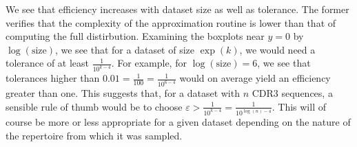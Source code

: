 \documentclass{article}
\begin{document}
We see that efficiency increases with dataset size as well as tolerance.
The former verifies that the complexity of the approximation routine is lower than that of computing the full distirbution.
Examining the boxplots near $y = 0$ by $\log(\text{size})$, we see that for a dataset of size $\exp(k)$, we would need a tolerance of at least $\frac{1}{10^{k - 4}}$.
For example, for $\log(\text{size}) = 6$, we see that tolerances higher than $0.01 = \frac{1}{100} = \frac{1}{10^{6 - 4}}$ would on average yield an efficiency greater than one.
This suggests that, for a dataset with $n$ CDR3 sequences, a sensible rule of thumb would be to choose $\varepsilon > \frac{1}{10^{k - 4}} = \frac{1}{10^{\log(n) - 4}}$.
This will of course be more or less appropriate for a given dataset depending on the nature of the repertoire from which it was sampled.
\end{document}
